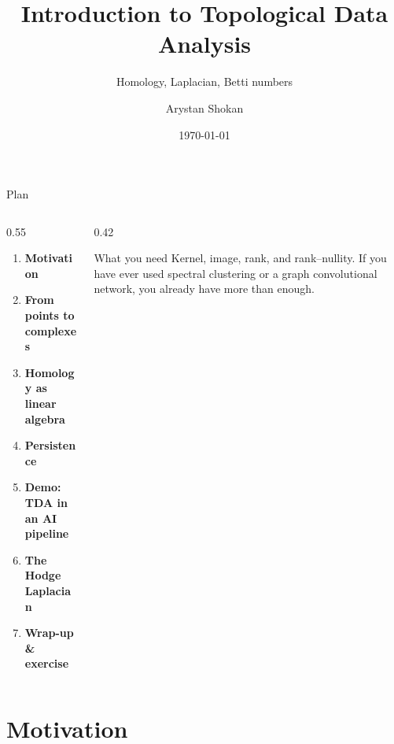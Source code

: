 \documentclass[10pt,aspectratio=169]{beamer}
\title{Introduction to Topological Data Analysis}
\subtitle{Homology, Laplacian, Betti numbers}
\author{Arystan Shokan}
\institute{Boston University}
\date{\today}
\begin{document}
    \maketitle

    \begin{frame}{Plan}
        \begin{columns}[T,onlytextwidth]
            \begin{column}{0.55\textwidth}
                \footnotesize
                \begin{enumerate}
                    \item \textbf{Motivation}
                    \item \textbf{From points to complexes}
                    \item \textbf{Homology as linear algebra}
                    \item \textbf{Persistence}
                    \item \textbf{Demo: TDA in an AI pipeline}
                    \item \textbf{The Hodge Laplacian}
                    \item \textbf{Wrap-up \& exercise}
                \end{enumerate}
                \vspace{0.2em}
            \end{column}
            \begin{column}{0.42\textwidth}
                \begin{block}{What you need}
                    \scriptsize
                    Kernel, image, rank, and rank--nullity. If you have ever used spectral clustering or
                    a graph convolutional network, you already have more than enough.
                \end{block}

            \end{column}
        \end{columns}
    \end{frame}

    \section{Motivation}
\end{document}
